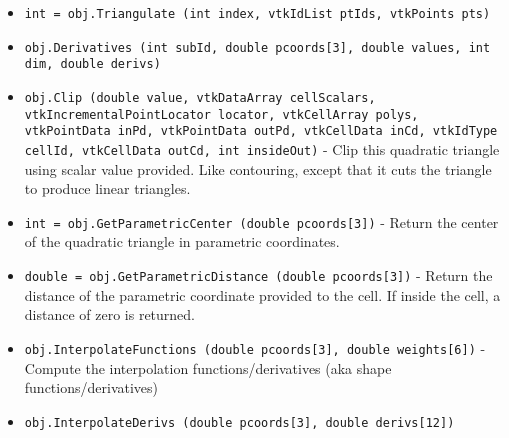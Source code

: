 \begin{itemize}
\item  \verb|int = obj.Triangulate (int index, vtkIdList ptIds, vtkPoints pts)|

\item  \verb|obj.Derivatives (int subId, double pcoords[3], double values, int dim, double derivs)|

\item  \verb|obj.Clip (double value, vtkDataArray cellScalars, vtkIncrementalPointLocator locator, vtkCellArray polys, vtkPointData inPd, vtkPointData outPd, vtkCellData inCd, vtkIdType cellId, vtkCellData outCd, int insideOut)| -  Clip this quadratic triangle using scalar value provided. Like
 contouring, except that it cuts the triangle to produce linear
 triangles.

\item  \verb|int = obj.GetParametricCenter (double pcoords[3])| -  Return the center of the quadratic triangle in parametric coordinates.

\item  \verb|double = obj.GetParametricDistance (double pcoords[3])| -  Return the distance of the parametric coordinate provided to the
 cell. If inside the cell, a distance of zero is returned.

\item  \verb|obj.InterpolateFunctions (double pcoords[3], double weights[6])| -  Compute the interpolation functions/derivatives
 (aka shape functions/derivatives)

\item  \verb|obj.InterpolateDerivs (double pcoords[3], double derivs[12])|

\end{itemize}
